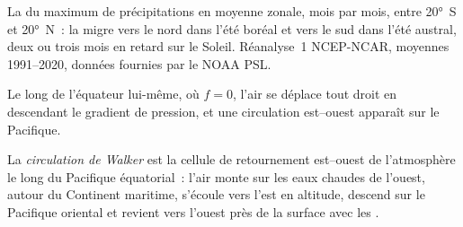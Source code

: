 \begin{omfigure}

{\small La  du maximum de précipitations en moyenne zonale, mois par mois, entre
\ang{20}~S et \ang{20}~N~: la  migre vers le nord dans
l'été boréal et vers le sud dans l'été austral, deux ou trois mois en retard sur le
Soleil.
Réanalyse~1 NCEP-NCAR, moyennes 1991--2020, données fournies par le NOAA PSL.}
\label{fig:b1:atmospheric-circulation:itcz}
\end{omfigure}

Le long de l'équateur lui-même, où $f = 0$, l'air se déplace tout droit en descendant le gradient de
pression, et une circulation est--ouest apparaît sur le Pacifique.

\begin{definition}\label{def:b1:atmospheric-circulation:walker}
La \emph{circulation de Walker} est la cellule de retournement est--ouest de
l'atmosphère le long du Pacifique équatorial~: l'air monte sur les eaux chaudes
de l'ouest, autour du Continent maritime, s'écoule vers l'est en altitude, descend sur le Pacifique
oriental et revient vers l'ouest près de la surface avec les .
\end{definition}

